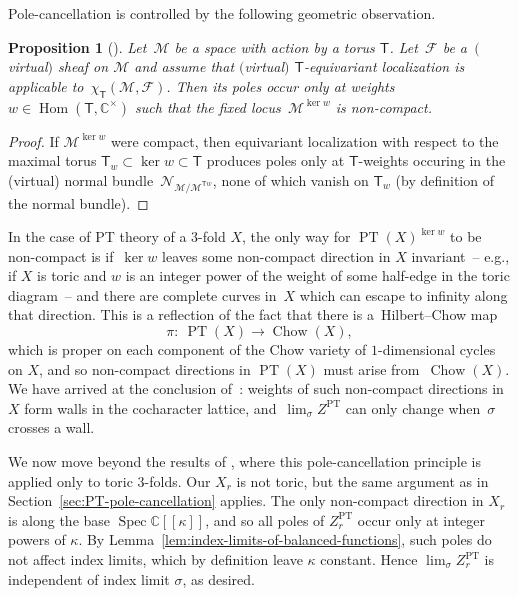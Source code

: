 \documentclass[10pt,a4paper]{amsart}
\numberwithin{equation}{section}
\newtheorem{Proposition}[Theorem]{Proposition}
\newcommand{\bC}{\mathbb{C}}
\newcommand{\cF}{\mathcal{F}}
\newcommand{\cM}{\mathcal{M}}
\newcommand{\cN}{\mathcal{N}}
\newcommand{\sT}{\mathsf{T}}
\DeclareMathOperator{\PT}{PT}
\DeclareMathOperator{\Chow}{Chow}
\DeclareMathOperator{\Hom}{Hom}
\DeclareMathOperator{\Spec}{Spec}
\begin{document}
\begin{MyParagraph}\label{sec:PT-pole-cancellation} Pole-cancellation is controlled by the following geometric observation.
\begin{Proposition}[{\cite[Proposition 3.2]{Arbesfeld2021}}] \label{prop:localization-poles}
 Let~$\cM$ be a space with action by a torus $\sT$. Let~$\cF$ be a~$($virtual$)$ sheaf on $\cM$ and assume that $($virtual$)$ $\sT$-equivariant
 localization is applicable to~$\chi_{\sT}(\cM, \cF)$. Then its poles
 occur only at weights $w \in \Hom(\sT, \bC^\times)$ such that the
 fixed locus~$\cM^{\ker w}$ is non-compact.
\end{Proposition}

\begin{proof}
 If $\cM^{\ker w}$ were compact, then equivariant localization with
 respect to the maximal torus $\sT_w \subset \ker w \subset \sT$
 produces poles only at $\sT$-weights occuring in the (virtual)
 normal bundle~$\cN_{\cM/\cM^{\sT w}}$, none of which vanish on
 $\sT_w$ (by definition of the normal bundle).
\end{proof}

In the case of PT theory of a $3$-fold $X$, the only way for
$\PT(X)^{\ker w}$ to be non-compact is if~$\ker w$ leaves some
non-compact direction in $X$ invariant~-- e.g., if $X$ is toric and
$w$ is an integer power of the weight of some half-edge in the toric
diagram~-- and there are complete curves in~$X$ which can escape to
infinity along that direction. This is a reflection of the fact that
there is a~Hilbert--Chow map
\[ \pi\colon \ \PT(X) \to \Chow(X), \]
which is proper on each component of the Chow variety of
$1$-dimensional cycles on $X$, and so non-compact directions in
$\PT(X)$ must arise from~$\Chow(X)$. We have arrived at the conclusion
of~\cite{Arbesfeld2021}: weights of such non-compact directions in~$X$
form walls in the cocharacter lattice, and~$\lim_\sigma Z^{\PT}$ can
only change when~$\sigma$ crosses a wall.
\end{MyParagraph}

\begin{MyParagraph}\label{sec:non-toric-gluings}
We now move beyond the results of \cite{Arbesfeld2021}, where this
pole-cancellation principle is applied only to toric $3$-folds. Our
$X_r$ is not toric, but the same argument as in
Section~\ref{sec:PT-pole-cancellation} applies. The only non-compact
direction in $X_r$ is along the base $\Spec \bC[[\kappa]]$, and so all
poles of $Z_r^{\PT}$ occur only at integer powers of $\kappa$. By
Lemma~\ref{lem:index-limits-of-balanced-functions}, such poles do not
affect index limits, which by definition leave $\kappa$ constant.
Hence $\lim_\sigma Z_r^{\PT}$ is independent of index limit $\sigma$,
as desired.
\end{MyParagraph}
\end{document}
